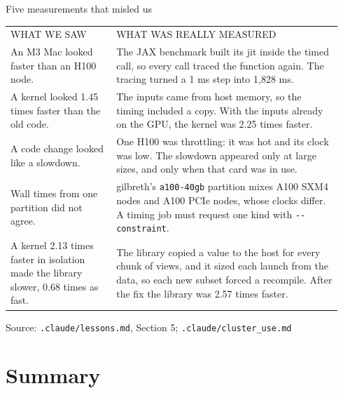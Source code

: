 \documentclass[aspectratio=169,10pt]{beamer}
\newcommand{\speclabel}[1]{\textcolor{inkGray}{\scriptsize\MakeUppercase{#1}}}
\newcommand{\source}[1]{\par\vfill{\scriptsize\textcolor{inkGray}{Source: #1}\par}}
\newcommand{\rowrule}{\\[3pt]\arrayrulecolor{inkGray!35}\hline\noalign{\vskip 3pt}}
\begin{document}
\begin{frame}{Five measurements that misled us}
  \vspace{0pt}
  {\footnotesize
  \begin{tabular}{@{}>{\raggedright\arraybackslash}p{0.30\linewidth}@{\hspace{10pt}}>{\raggedright\arraybackslash}p{0.64\linewidth}@{}}
    \speclabel{what we saw} & \speclabel{what was really measured} \rowrule
    An M3 Mac looked faster than an H100 node. & The JAX benchmark built its jit inside the timed call, so every call traced the function again.  The tracing turned a 1 ms step into 1,828 ms. \rowrule
    A kernel looked 1.45 times faster than the old code. & The inputs came from host memory, so the timing included a copy.  With the inputs already on the GPU, the kernel was 2.25 times faster. \rowrule
    A code change looked like a slowdown. & One H100 was throttling: it was hot and its clock was low.  The slowdown appeared only at large sizes, and only when that card was in use. \rowrule
    Wall times from one partition did not agree. & gilbreth's \texttt{a100-40gb} partition mixes A100 SXM4 nodes and A100 PCIe nodes, whose clocks differ.  A timing job must request one kind with \texttt{-{}-constraint}. \rowrule
    A kernel 2.13 times faster in isolation made the library slower, 0.68 times as fast. & The library copied a value to the host for every chunk of views, and it sized each launch from the data, so each new subset forced a recompile.  After the fix the library was 2.57 times faster. \\
  \end{tabular}}
  \source{\texttt{.claude/lessons.md}, Section 5; \texttt{.claude/cluster\_use.md}}
\end{frame}

\section{Summary}
\end{document}
